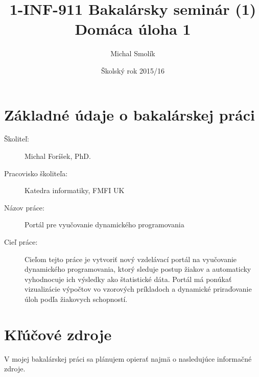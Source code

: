 \documentclass[11pt,a4paper]{article}
\begin{document}
\title{1-INF-911 Bakalársky seminár (1)\\
Domáca úloha 1}
\date{Školský rok 2015/16}
\author{Michal Smolík}

\maketitle


\section{Základné údaje o bakalárskej práci}

\begin{description}
\item[Školiteľ:] Michal Foríšek, PhD. 
\item[Pracovisko školiteľa:] Katedra informatiky, FMFI UK
\item[Názov práce:]Portál pre vyučovanie dynamického programovania

\item[Cieľ práce:]Cieľom tejto práce je vytvoriť nový vzdelávací portál
na vyučovanie dynamického programovania, ktorý sleduje postup žiakov
a automaticky vyhodnocuje ich výsledky ako štatistické dáta. Portál
má ponúkať vizualizácie výpočtov vo vzorových príkladoch a dynamické
priraďovanie úloh podľa žiakovych schopností.
\end{description}

\section{Kľúčové zdroje}

V mojej bakalárskej práci sa plánujem opierať najmä o nasledujúce
informačné zdroje.
\end{document}
